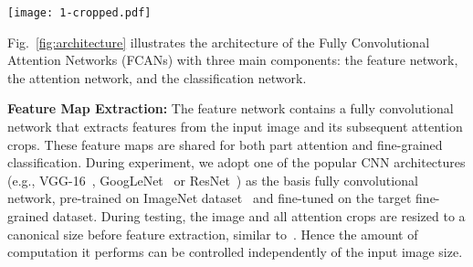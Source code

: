 \documentclass[10pt,twocolumn,letterpaper]{article}
\begin{document}
\begin{figure*}[t]
\begin{center}
\texttt{[image: 1-cropped.pdf]}
\end{center}
\caption{The architecture of our FCANs framework.
In this example, the attention network finds two parts of different sizes (the blue region and the yellow region).
The upper part shows the architecture for testing, and the lower part shows the architecture for training.
During testing, we crop all corresponding part patches from the high resolution image for classification.
During training, we re-use the convolutional features in the attention networks for classification.
Note that during testing, we can compute all part attentions simultaneously, which makes the model computationally more efficient than traditional recurrent attention models.
}
\label{fig:architecture}
\vspace{-8pt}
\end{figure*}

Fig.~\ref{fig:architecture} illustrates the architecture of the Fully Convolutional Attention Networks (FCANs) with three main components: the feature network, the attention network, and the classification network.

\textbf{Feature Map Extraction:}
The feature network contains a fully convolutional network that extracts features from the input image and its subsequent attention crops.
These feature maps are shared for both part attention and fine-grained classification.
During experiment, we adopt one of the popular CNN architectures (e.g., VGG-16~\cite{simonyan2014very}, GoogLeNet~\cite{szegedy2015going} or ResNet~\cite{he2016deep}) as the basis fully convolutional network, pre-trained on ImageNet dataset~\cite{wang2014object} and fine-tuned on the target fine-grained dataset.
During testing, the image and all attention crops are resized to a canonical size before feature extraction, similar to~\cite{mnih2014recurrent}.
Hence the amount of computation it performs can be controlled independently of the input image size.
\end{document}
